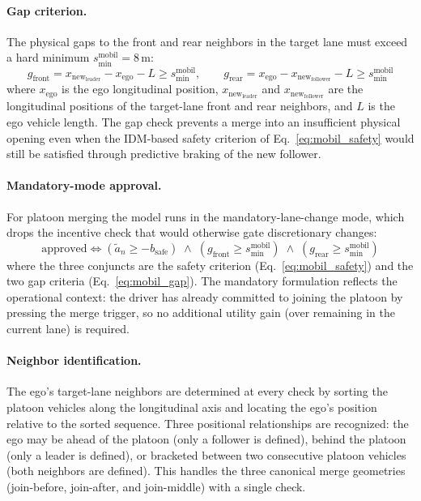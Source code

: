 \documentclass[12pt,a4paper,oneside]{report}
\begin{document}
\paragraph{Gap criterion.} The physical gaps to the front and rear neighbors in the target lane must exceed a hard minimum $s_{\min}^{\text{mobil}} = 8\,\mathrm{m}$:
\begin{equation}
g_{\text{front}} = x_{\text{new}_\text{leader}} - x_{\text{ego}} - L \geq s_{\min}^{\text{mobil}}, \qquad g_{\text{rear}} = x_{\text{ego}} - x_{\text{new}_\text{follower}} - L \geq s_{\min}^{\text{mobil}}
\label{eq:mobil_gap}
\end{equation}
where $x_{\text{ego}}$ is the ego longitudinal position, $x_{\text{new}_\text{leader}}$ and $x_{\text{new}_\text{follower}}$ are the longitudinal positions of the target-lane front and rear neighbors, and $L$ is the ego vehicle length. The gap check prevents a merge into an insufficient physical opening even when the IDM-based safety criterion of Eq.~\eqref{eq:mobil_safety} would still be satisfied through predictive braking of the new follower.

\paragraph{Mandatory-mode approval.} For platoon merging the model runs in the mandatory-lane-change mode, which drops the incentive check that would otherwise gate discretionary changes:
\begin{equation}
\text{approved} \iff \left( \tilde{a}_n \geq -b_{\text{safe}} \right) \; \land \; \left( g_{\text{front}} \geq s_{\min}^{\text{mobil}} \right) \; \land \; \left( g_{\text{rear}} \geq s_{\min}^{\text{mobil}} \right)
\label{eq:mobil_approval}
\end{equation}
where the three conjuncts are the safety criterion (Eq.~\eqref{eq:mobil_safety}) and the two gap criteria (Eq.~\eqref{eq:mobil_gap}). The mandatory formulation reflects the operational context: the driver has already committed to joining the platoon by pressing the merge trigger, so no additional utility gain (over remaining in the current lane) is required.

\paragraph{Neighbor identification.} The ego's target-lane neighbors are determined at every check by sorting the platoon vehicles along the longitudinal axis and locating the ego's position relative to the sorted sequence. Three positional relationships are recognized: the ego may be ahead of the platoon (only a follower is defined), behind the platoon (only a leader is defined), or bracketed between two consecutive platoon vehicles (both neighbors are defined). This handles the three canonical merge geometries (join-before, join-after, and join-middle) with a single check.
\end{document}
